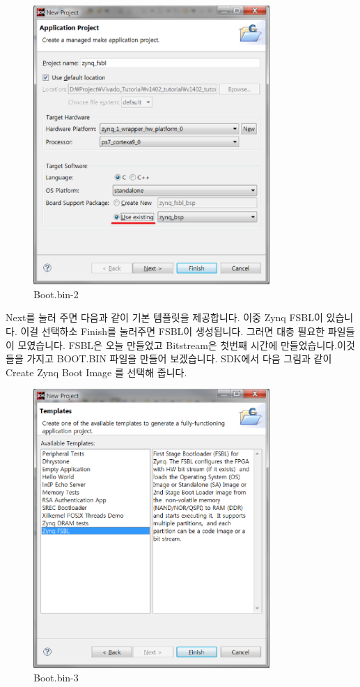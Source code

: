 \documentclass[11pt
  , a4paper
  , article
  , oneside
]{memoir}
\begin{document}
\begin{figure}[h!]
	\centering
	\includegraphics[width=0.8\textwidth]{./images/boot_bin_3.eps}
	\caption{Boot.bin-2}
	\label{fig:boot.bin.2} 
\end{figure}

\clearpage

Next를 눌러 주면 다음과 같이 기본 템플릿을 제공합니다. 이중 Zynq FSBL이 있습니다. 이걸 선택하소 Finish를 눌러주면 FSBL이 생성됩니다. 그러면 대충 필요한 파일들이 모였습니다. FSBL은 오늘 만들었고 Bitstream은 첫번째 시간에 만들었습니다.이것들을 가지고 BOOT.BIN 파일을 만들어 보겠습니다. SDK에서 다음 그림과 같이 Create Zynq Boot Image 를 선택해 줍니다.

\begin{figure}[h!]
	\centering
	\includegraphics[width=0.8\textwidth]{./images/boot_bin_4.eps}
	\caption{Boot.bin-3}
	\label{fig:boot.bin.3} 
\end{figure}
\end{document}
